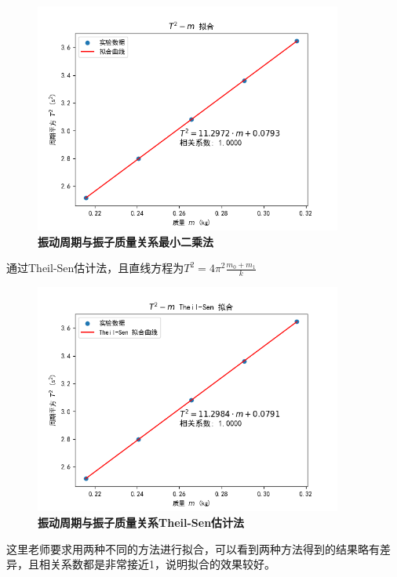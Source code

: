 \documentclass[UTF8]{article}
\theoremstyle{MyLineTheoremStyle} %
\theoremstyle{MyBlockTheoremStyle} %
\theoremstyle{MySubsubsectionStyle} %
\begin{document}
\begin{figure}[H]
    \centering
    \includegraphics[width=0.9\textwidth]{Figure_1.png}
    \caption{\bfseries 振动周期与振子质量关系最小二乘法}
    \label{$T^2-m最小二乘法拟合图像$}
\end{figure}

\indent 通过Theil-Sen估计法，且直线方程为$T^{2}=4\pi^{2}\frac{m_{0}+m_{1}}{k}$\\

\begin{figure}[H]
    \centering
    \includegraphics[width=0.9\textwidth]{Figure_2.png}
    \caption{\bfseries 振动周期与振子质量关系Theil-Sen估计法}
    \label{$T^2-m Theil-Sen估计拟合图像$}
\end{figure}

\indent 这里老师要求用两种不同的方法进行拟合，可以看到两种方法得到的结果略有差异，且相关系数都是非常接近1，说明拟合的效果较好。\\
\end{document}
